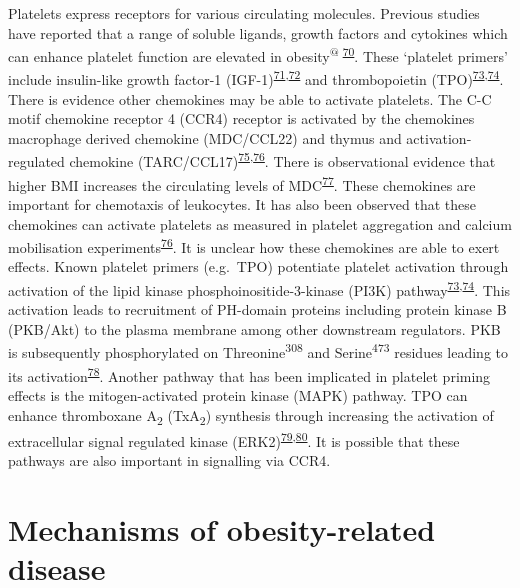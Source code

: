 \documentclass[11pt,twoside]{bristolthesis}
\begin{document}
Platelets express receptors for various circulating molecules. Previous studies have reported that a range of soluble ligands, growth factors and cytokines which can enhance platelet function are elevated in obesity\textsuperscript{@ \protect\hyperlink{ref-Maury2010a}{70}}. These `platelet primers' include insulin-like growth factor-1 (IGF-1)\textsuperscript{\protect\hyperlink{ref-Frystyk1995}{71},\protect\hyperlink{ref-Hers2007}{72}} and thrombopoietin (TPO)\textsuperscript{\protect\hyperlink{ref-Blair2015}{73},\protect\hyperlink{ref-Pasquet2000}{74}}. There is evidence other chemokines may be able to activate platelets. The C-C motif chemokine receptor 4 (CCR4) receptor is activated by the chemokines macrophage derived chemokine (MDC/CCL22) and thymus and activation-regulated chemokine (TARC/CCL17)\textsuperscript{\protect\hyperlink{ref-Kowalska2000}{75},\protect\hyperlink{ref-Abi-Younes2001}{76}}. There is observational evidence that higher BMI increases the circulating levels of MDC\textsuperscript{\protect\hyperlink{ref-Kitahara2014}{77}}. These chemokines are important for chemotaxis of leukocytes. It has also been observed that these chemokines can activate platelets as measured in platelet aggregation and calcium mobilisation experiments\textsuperscript{\protect\hyperlink{ref-Abi-Younes2001}{76}}. It is unclear how these chemokines are able to exert effects. Known platelet primers (e.g.~TPO) potentiate platelet activation through activation of the lipid kinase phosphoinositide-3-kinase (PI3K) pathway\textsuperscript{\protect\hyperlink{ref-Blair2015}{73},\protect\hyperlink{ref-Pasquet2000}{74}}. This activation leads to recruitment of PH-domain proteins including protein kinase B (PKB/Akt) to the plasma membrane among other downstream regulators. PKB is subsequently phosphorylated on Threonine\textsuperscript{308} and Serine\textsuperscript{473} residues leading to its activation\textsuperscript{\protect\hyperlink{ref-Hemmings2015}{78}}. Another pathway that has been implicated in platelet priming effects is the mitogen-activated protein kinase (MAPK) pathway. TPO can enhance thromboxane A\textsubscript{2} (TxA\textsubscript{2}) synthesis through increasing the activation of extracellular signal regulated kinase (ERK2)\textsuperscript{\protect\hyperlink{ref-Ezumi1998}{79},\protect\hyperlink{ref-VanWilligen2000}{80}}. It is possible that these pathways are also important in signalling via CCR4.

\hypertarget{mechanisms-of-obesity-related-disease}{%
\section{Mechanisms of obesity-related disease}\label{mechanisms-of-obesity-related-disease}}
\end{document}

